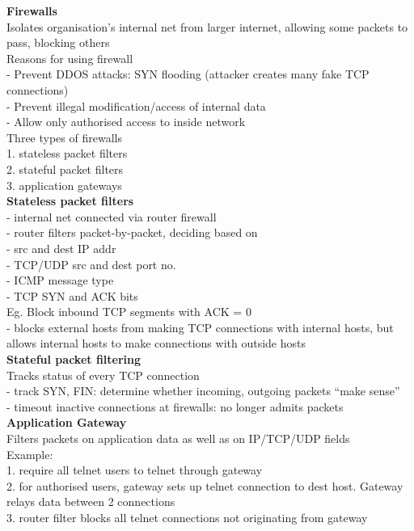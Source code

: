\documentclass[10pt, a4paper]{article}
\newcommand{\blue}[1]{{\color{MidnightBlue}#1}}
\newcommand{\red}[1]{{\color{red}#1}}
\newcommand{\tab}[0]{\hspace*{2mm}}
\begin{document}
\begin{multicols*}{3}
		\textbf{Firewalls}\\
		Isolates organisation's internal net from larger internet, allowing some packets to pass, blocking others\\
		Reasons for using firewall\\
		- Prevent DDOS attacks: SYN flooding (attacker creates many fake TCP connections)\\
		- Prevent illegal modification/access of internal data\\
		- Allow only authorised access to inside network\\

		Three types of firewalls\\
		1. stateless packet filters\\
		2. stateful packet filters\\
		3. application gateways\\

		\textbf{Stateless packet filters}\\
		- internal net connected via \red{router firewall}\\
		- router filters \red{packet-by-packet}, deciding based on\\
		\tab - src and dest IP addr\\
		\tab - TCP/UDP src and dest port no.\\
		\tab - ICMP message type\\
		\tab - TCP SYN and ACK bits\\
		Eg. Block inbound TCP segments with ACK = 0\\
		- blocks external hosts from making TCP connections with internal hosts, but allows internal hosts to make connections with outside hosts\\

		\textbf{Stateful packet filtering}\\
		Tracks status of \blue{every TCP connection}\\
		- track SYN, FIN: determine whether incoming, outgoing packets ``make sense''\\
		- timeout inactive connections at firewalls: no longer admits packets\\

		\textbf{Application Gateway}\\
		Filters packets on \blue{application data} as well as on IP/TCP/UDP fields\\
		Example:\\
		1. require all telnet users to telnet through gateway\\
		2. for authorised users, gateway sets up telnet connection to dest host. Gateway relays data between 2 connections\\
		3. router filter blocks all telnet connections not originating from gateway\\


\end{multicols*}
\end{document}
